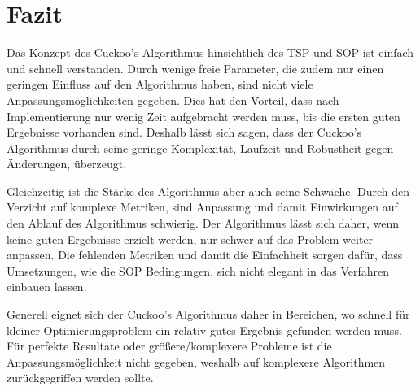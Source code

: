 \documentclass[conference]{IEEEtran}
\begin{document}
  \section{Fazit}
    Das Konzept des Cuckoo's Algorithmus hinsichtlich des TSP und SOP ist einfach und schnell verstanden.
    Durch wenige freie Parameter, die zudem nur einen geringen Einfluss auf den Algorithmus haben, sind nicht viele Anpassungsmöglichkeiten gegeben. 
    Dies hat den Vorteil, dass nach Implementierung nur wenig Zeit aufgebracht werden muss, bis die ersten guten Ergebnisse vorhanden sind. 
    Deshalb lässt sich sagen, dass der Cuckoo's Algorithmus durch seine geringe Komplexität,  
    Laufzeit und Robustheit gegen Änderungen, überzeugt. 

    Gleichzeitig ist die Stärke des Algorithmus aber auch seine Schwäche. Durch den Verzicht 
    auf komplexe Metriken, sind Anpassung und damit Einwirkungen auf den Ablauf des Algorithmus schwierig.
    Der Algorithmus lässt sich daher, wenn keine guten Ergebnisse erzielt werden, nur schwer auf das Problem weiter anpassen. 
    Die fehlenden Metriken und damit die Einfachheit sorgen dafür, dass Umsetzungen, wie die SOP Bedingungen, sich nicht elegant in das 
    Verfahren einbauen lassen.

    Generell eignet sich der Cuckoo's Algorithmus daher in Bereichen, wo schnell für kleiner Optimierungsproblem ein relativ 
    gutes Ergebnis gefunden werden muss. Für perfekte Resultate oder größere/komplexere Probleme ist die Anpassungsmöglichkeit 
    nicht gegeben, weshalb auf komplexere Algorithmen zurückgegriffen werden sollte.
\end{document}

